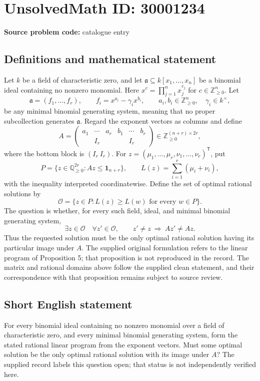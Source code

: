 \documentclass[11pt]{article}
\begin{document}
\section*{UnsolvedMath ID: 30001234}
\textbf{Source problem code:} catalogue entry
\subsection{Definitions and mathematical statement}
Let \(k\) be a field of characteristic zero, and let \(\mathfrak a\subseteq k[x_1,\ldots,x_n]\) be a binomial ideal containing no nonzero monomial. Here \(x^c=\prod_{j=1}^n x_j^{c_j}\) for \(c\in\mathbb Z_{\geq0}^n\). Let
\[
\mathfrak a=(f_1,\ldots,f_r),\qquad f_i=x^{a_i}-\gamma_i x^{b_i},\qquad a_i,b_i\in\mathbb Z_{\geq0}^n,\quad \gamma_i\in k^\times,
\]
be any minimal binomial generating system, meaning that no proper subcollection generates \(\mathfrak a\). Regard the exponent vectors as columns and define
\[
A=\begin{pmatrix}
a_1&\cdots&a_r&b_1&\cdots&b_r\\
&I_r&&&I_r&
\end{pmatrix}\in\mathbb Z_{\geq0}^{(n+r)\times 2r},
\]
where the bottom block is \((I_r\ I_r)\). For \(z=(\mu_1,\ldots,\mu_r,\nu_1,\ldots,\nu_r)^{\mathsf T}\), put
\[
P=\{z\in\mathbb Q_{\geq0}^{2r}:Az\leq\mathbf1_{n+r}\},\qquad L(z)=\sum_{i=1}^r(\mu_i+\nu_i),
\]
with the inequality interpreted coordinatewise. Define the set of optimal rational solutions by
\[
\mathcal O=\{z\in P:L(z)\geq L(w)\text{ for every }w\in P\}.
\]
The question is whether, for every such field, ideal, and minimal binomial generating system,
\[
\exists z\in\mathcal O\quad\forall z'\in\mathcal O,\qquad z'\ne z\ \Longrightarrow\ Az'\ne Az.
\]
Thus the requested solution must be the only optimal rational solution having its particular image under \(A\). The supplied original formulation refers to the linear program of Proposition 5; that proposition is not reproduced in the record. The matrix and rational domains above follow the supplied clean statement, and their correspondence with that proposition remains subject to source review.
\subsection{Short English statement}
For every binomial ideal containing no nonzero monomial over a field of characteristic zero, and every minimal binomial generating system, form the stated rational linear program from the exponent vectors. Must some optimal solution be the only optimal rational solution with its image under \(A\)? The supplied record labels this question open; that status is not independently verified here.
\end{document}
